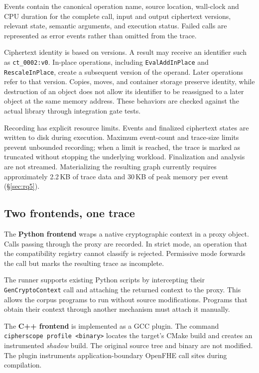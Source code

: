 \documentclass[sigconf,nonacm]{acmart}
\begin{document}
Events contain the canonical operation name, source location, wall-clock and
CPU duration for the complete call, input and output ciphertext versions,
relevant state, semantic arguments, and execution status. Failed calls are
represented as error events rather than omitted from the trace.

Ciphertext identity is based on versions. A result may receive an identifier
such as \texttt{ct\_0002:v0}. In-place operations, including
\texttt{EvalAddInPlace} and \texttt{RescaleInPlace}, create a subsequent
version of the operand. Later operations refer to that version. Copies,
moves, and container storage preserve identity, while destruction of an
object does not allow its identifier to be reassigned to a later object at
the same memory address. These behaviors are checked against the actual
library through integration gate tests.

Recording has explicit resource limits. Events and finalized ciphertext
states are written to disk during execution. Maximum event-count and
trace-size limits prevent unbounded recording; when a limit is reached, the
trace is marked as truncated without stopping the underlying workload.
Finalization and analysis are not streamed. Materializing the resulting graph
currently requires approximately 2.2\,KB of trace data and 30\,KB of peak
memory per event (\S\ref{sec:rq5}).

\subsection{Two frontends, one trace}
\label{sec:frontends}

The \textbf{Python frontend} wraps a native cryptographic context in a proxy
object. Calls passing through the proxy are recorded. In strict mode, an
operation that the compatibility registry cannot classify is rejected.
Permissive mode forwards the call but marks the resulting trace as
incomplete.

The runner supports existing Python scripts by intercepting their
\texttt{GenCryptoContext} call and attaching the returned context to the
proxy. This allows the corpus programs to run without source modifications.
Programs that obtain their context through another mechanism must attach it
manually.

The \textbf{C++ frontend} is implemented as a GCC plugin. The command
\texttt{cipherscope profile <binary>} locates the target's CMake build and
creates an instrumented \emph{shadow} build. The original source tree and
binary are not modified. The plugin instruments application-boundary OpenFHE
call sites during compilation.
\end{document}
